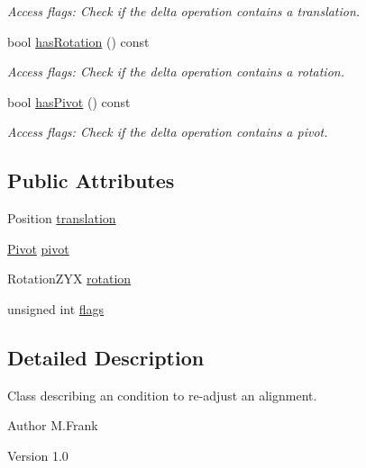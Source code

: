 \begin{DoxyCompactItemize}
\begin{DoxyCompactList}\small\item\em Access flags: Check if the delta operation contains a translation. \item\end{DoxyCompactList}\item 
bool \hyperlink{class_d_d4hep_1_1_alignments_1_1_delta_a0a152e2828b449449094100ba4efb4c6}{hasRotation} () const 
\begin{DoxyCompactList}\small\item\em Access flags: Check if the delta operation contains a rotation. \item\end{DoxyCompactList}\item 
bool \hyperlink{class_d_d4hep_1_1_alignments_1_1_delta_ad50ffdd1939dad697c42040102309a29}{hasPivot} () const 
\begin{DoxyCompactList}\small\item\em Access flags: Check if the delta operation contains a pivot. \item\end{DoxyCompactList}\end{DoxyCompactItemize}
\subsection*{Public Attributes}
\begin{DoxyCompactItemize}
\item 
Position \hyperlink{class_d_d4hep_1_1_alignments_1_1_delta_af53e050fbb66b78037d8ab20a59ff737}{translation}
\item 
\hyperlink{class_d_d4hep_1_1_alignments_1_1_delta_a9ff8cc825f916a4ae84f1780c11f2519}{Pivot} \hyperlink{class_d_d4hep_1_1_alignments_1_1_delta_acc2685bae6a2d77214b537136c31c653}{pivot}
\item 
RotationZYX \hyperlink{class_d_d4hep_1_1_alignments_1_1_delta_ae901fae9cfcb9b8dd337943adeda4f0b}{rotation}
\item 
unsigned int \hyperlink{class_d_d4hep_1_1_alignments_1_1_delta_a0d3375bd33c904430901e1ac3c1a1660}{flags}
\end{DoxyCompactItemize}


\subsection{Detailed Description}
Class describing an condition to re-\/adjust an alignment. \begin{DoxyAuthor}{Author}
M.Frank 
\end{DoxyAuthor}
\begin{DoxyVersion}{Version}
1.0 
\end{DoxyVersion}


